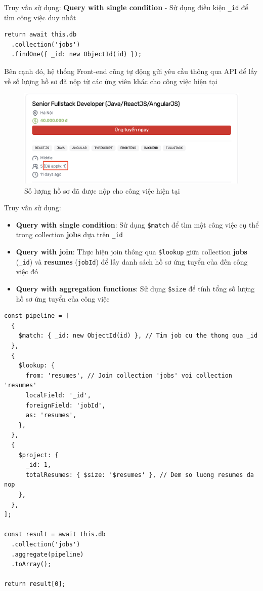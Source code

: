 Truy vấn sử dụng: \textbf{Query with single condition} - Sử dụng điều kiện \texttt{\_id} để tìm công việc duy nhất

\begin{lstlisting}
return await this.db
  .collection('jobs')
  .findOne({ _id: new ObjectId(id) });
\end{lstlisting}

Bên cạnh đó, hệ thống Front-end cũng tự động gửi yêu cầu thông qua API để lấy về số lượng hồ sơ đã nộp từ các ứng viên khác cho công việc hiện tại

\begin{figure}[H]
    \centering
    \includegraphics[width=.75\linewidth]{DBMS-Application/Images/number-resumes-apply.png}
    \caption{Số lượng hồ sơ đã được nộp cho công việc hiện tại}
\end{figure}

Truy vấn sử dụng:
\begin{itemize}
    \item \textbf{Query with single condition}: Sử dụng \texttt{\$match} để tìm một công việc cụ thể trong collection \textbf{jobs} dựa trên \texttt{\_id}
    
    \item \textbf{Query with join}: Thực hiện join thông qua \texttt{\$lookup} giữa collection \textbf{jobs} (\texttt{\_id}) và \textbf{resumes} (\texttt{jobId}) để lấy danh sách hồ sơ ứng tuyển của đến công việc đó

    \item \textbf{Query with aggregation functions}: Sử dụng \texttt{\$size} để tính tổng số lượng hồ sơ ứng tuyển của công việc
\end{itemize}

\begin{lstlisting}
const pipeline = [
  {
    $match: { _id: new ObjectId(id) }, // Tim job cu the thong qua _id
  },
  {
    $lookup: {
      from: 'resumes', // Join collection 'jobs' voi collection 'resumes'
      localField: '_id',
      foreignField: 'jobId',
      as: 'resumes',
    },
  },
  {
    $project: {
      _id: 1,
      totalResumes: { $size: '$resumes' }, // Dem so luong resumes da nop
    },
  },
];

const result = await this.db
  .collection('jobs')
  .aggregate(pipeline)
  .toArray();

return result[0];
\end{lstlisting}

